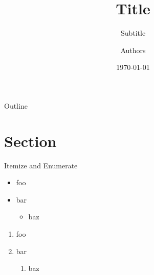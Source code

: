 
\title[Title at bottom]{Title}
\subtitle{Subtitle}
\author[Authors at bottom]{Authors}
\date[\today]{\today}

\raggedright
\AtBeginSection{\frame{\sectionpage}}





\begin{frame}[plain]
  \titlepage
\end{frame}

\begin{frame}{Outline}
\tableofcontents
\end{frame}

\section{Section}


\begin{frame}{Itemize and Enumerate}
    \begin{itemize}
      \item foo
      \item bar
        \begin{itemize}
          \item baz
        \end{itemize}
    \end{itemize}
    \begin{enumerate}
      \item foo
      \item bar
        \begin{enumerate}
          \item baz
        \end{enumerate}
    \end{enumerate}
\end{frame}

